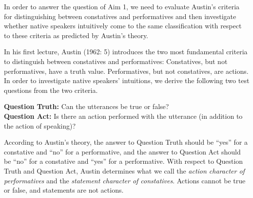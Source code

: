 \documentclass[egregdoesnotlikesansseriftitles,12pt]{scrartcl}
\begin{document}
In order to answer the question of Aim 1, we need to evaluate Austin's criteria for distinguishing between constatives and performatives and then investigate whether native speakers intuitively come to the same classification with respect to these criteria as predicted by Austin's theory.

In his first lecture, Austin (1962: 5) introduces the two most fundamental criteria to distinguish between constatives and performatives: Constatives, but not performatives, have a truth value. Performatives, but not constatives, are actions. In order to investigate native speakers' intuitions, we derive the following two test questions from the two criteria.\\

\begin{addmargin}[11pt]{0pt}
   \textbf{Question Truth:} Can the utterances be true or false?\\
   
   \noindent\textbf{Question Act:} Is there an action performed with the utterance (in addition to the action of speaking)?\\
\end{addmargin}

\noindent According to Austin's theory, the answer to Question Truth should be ``yes'' for a constative and ``no'' for a performative, and the answer to Question Act should be ``no'' for a constative and ``yes'' for a performative. With respect to Question Truth and Question Act, Austin determines what we call the \textit{action character of performatives} and the \textit{statement character of constatives}. Actions cannot be true or false, and statements are not actions.
\end{document}

